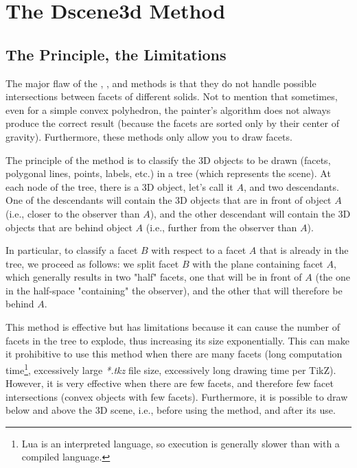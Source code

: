 \section{The Dscene3d Method}

\subsection{The Principle, the Limitations}

The major flaw of the , , and  methods is that they do not handle possible intersections between facets of different solids. Not to mention that sometimes, even for a simple convex polyhedron, the painter's algorithm does not always produce the correct result (because the facets are sorted only by their center of gravity). Furthermore, these methods only allow you to draw facets.

The principle of the  method is to classify the 3D objects to be drawn (facets, polygonal lines, points, labels, etc.) in a tree (which represents the scene). At each node of the tree, there is a 3D object, let's call it $A$, and two descendants. One of the descendants will contain the 3D objects that are in front of object $A$ (i.e., closer to the observer than $A$), and the other descendant will contain the 3D objects that are behind object $A$ (i.e., further from the observer than $A$).

In particular, to classify a facet $B$ with respect to a facet $A$ that is already in the tree, we proceed as follows: we split facet $B$ with the plane containing facet $A$, which generally results in two "half" facets, one that will be in front of $A$ (the one in the half-space "containing" the observer), and the other that will therefore be behind $A$.

This method is effective but has limitations because it can cause the number of facets in the tree to explode, thus increasing its size exponentially. This can make it prohibitive to use this method when there are many facets (long computation time\footnote{Lua is an interpreted language, so execution is generally slower than with a compiled language.}, excessively large \emph{*.tkz} file size, excessively long drawing time per TikZ). However, it is very effective when there are few facets, and therefore few facet intersections (convex objects with few facets). Furthermore, it is possible to draw below and above the 3D scene, i.e., before using the  method, and after its use.

